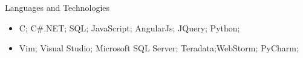 \documentclass[]{nakulcv}
\begin{document}
	\begin{cvsection}{Languages and Technologies}
		\begin{cvsubsection}{}{}{}	
			\begin{itemize}
				\item C; C\#.NET; SQL; JavaScript; AngularJs; JQuery; Python;  
				\item Vim; Visual Studio; Microsoft SQL Server; Teradata;WebStorm; PyCharm;
			\end{itemize}
		\end{cvsubsection}
	\end{cvsection}
\end{document}
